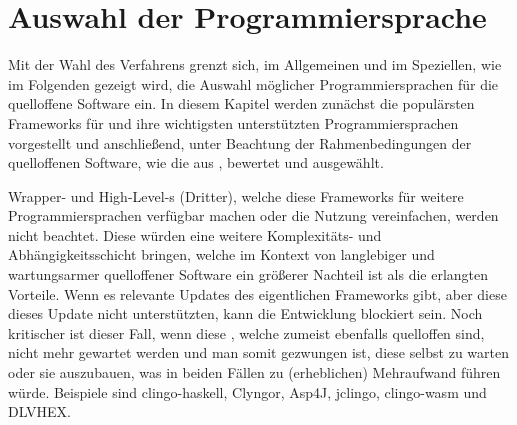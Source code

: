 \section{Auswahl der Programmiersprache}\label{sec:auswahl-der-programmiersprache}

Mit der Wahl des Verfahrens grenzt sich, im Allgemeinen und \insb im Speziellen, wie im Folgenden gezeigt wird, die Auswahl möglicher Programmiersprachen für die quelloffene Software ein.
In diesem Kapitel werden zunächst die populärsten Frameworks für  und ihre wichtigsten unterstützten Programmiersprachen vorgestellt und anschließend, unter Beachtung der Rahmenbedingungen der quelloffenen Software, wie die aus , bewertet und ausgewählt.

Wrapper- und High-Level-s (Dritter), welche diese Frameworks für weitere Programmiersprachen verfügbar machen oder die Nutzung vereinfachen, werden nicht beachtet.
Diese würden eine weitere Komplexitäts- und Abhängigkeitsschicht bringen, welche im Kontext von langlebiger und wartungsarmer quelloffener Software ein größerer Nachteil ist als die erlangten Vorteile.
Wenn es \zB relevante Updates des eigentlichen Frameworks gibt, aber diese  dieses Update nicht unterstützten, kann die Entwicklung blockiert sein.
Noch kritischer ist dieser Fall, wenn diese , welche zumeist ebenfalls quelloffen sind, nicht mehr gewartet werden und man somit gezwungen ist, diese selbst zu warten oder sie auszubauen, was in beiden Fällen zu (erheblichen) Mehraufwand führen würde.
Beispiele sind clingo-haskell, Clyngor, Asp4J, jclingo, clingo-wasm und DLVHEX.


